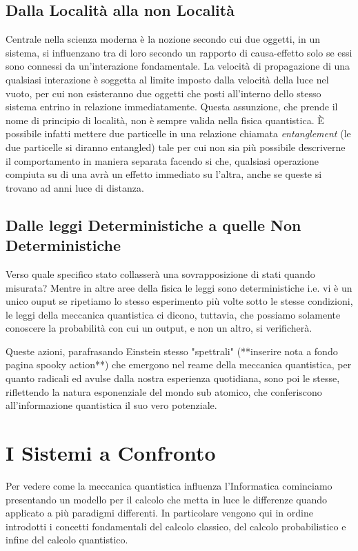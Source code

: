 \documentclass[12pt,a4paper,openright]{report}
\begin{document}
\subsection{Dalla Località alla non Località}
Centrale nella scienza moderna è la nozione secondo cui due oggetti, in un sistema, si influenzano tra di loro secondo un rapporto di causa-effetto solo se essi
sono connessi da un'interazione fondamentale. La velocità di propagazione di una qualsiasi interazione è soggetta al limite imposto dalla velocità della luce 
nel vuoto, per cui non esisteranno due oggetti che posti all'interno dello stesso sistema entrino in relazione immediatamente. Questa assunzione, 
che prende il nome di principio di località, non è sempre valida nella fisica quantistica. È possibile infatti
mettere due particelle in una relazione chiamata \emph{entanglement} (le due particelle si diranno entangled) tale per cui non sia più possibile
descriverne il comportamento in maniera separata facendo si che, qualsiasi  operazione compiuta su di una avrà un effetto immediato su l'altra, 
anche se queste si trovano ad anni luce di distanza.    

\subsection{Dalle leggi Deterministiche a quelle Non Deterministiche}
Verso quale specifico stato collasserà una sovrapposizione di stati quando misurata? Mentre in altre aree della fisica le leggi sono deterministiche 
i.e. vi è un unico ouput se ripetiamo lo stesso esperimento più volte sotto le stesse condizioni, le leggi della meccanica quantistica
ci dicono, tuttavia, che possiamo solamente conoscere la probabilità con cui un output, e non un altro, si verificherà. \par

Queste azioni, parafrasando Einstein stesso "spettrali" (**inserire nota a fondo pagina spooky action**) che emergono nel reame della meccanica quantistica, per quanto radicali ed avulse
dalla nostra esperienza quotidiana, sono poi le stesse, riflettendo la natura esponenziale del mondo sub atomico, che conferiscono all'informazione quantistica il suo vero potenziale. 

\section{I Sistemi a Confronto}
Per vedere come la meccanica quantistica influenza l'Informatica cominciamo presentando un modello per il calcolo che metta in luce 
le differenze quando applicato a più paradigmi differenti. In particolare vengono qui in ordine introdotti i concetti fondamentali 
del calcolo classico, del calcolo probabilistico e infine del calcolo quantistico.
\end{document}
